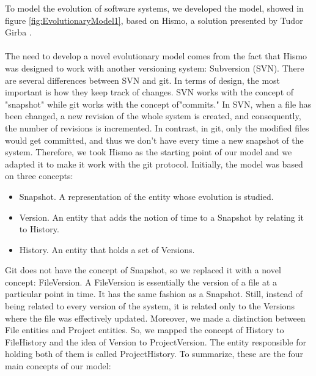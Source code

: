 To model the evolution of software systems, we developed the model, 
showed in figure \ref{fig:EvolutionaryModel1}, based on Hismo, a solution presented by Tudor Girba \cite{Girba2005}.\\
\\
The need to develop a novel evolutionary model comes from the fact that Hismo was designed to work with another versioning system: Subversion (SVN). 
There are several differences between SVN and git. In terms of design, the most important is how they keep track of changes. 
SVN works with the concept of "snapshot" while git works with the concept of"commits." 
In SVN, when a file has been changed, a new revision of the whole system is created, and consequently, the number of revisions is incremented. 
In contrast, in git, only the modified files would get committed, and thus we don't have every time a new snapshot of the system. 
Therefore, we took Hismo as the starting point of our model and we adapted it to make it work with the git protocol. 
Initially, the model was based on three concepts:
\begin{itemize}
    \item Snapshot. A representation of the entity whose evolution is studied.
    \item Version. An entity that adds the notion of time to a Snapshot by relating it to History. 
    \item History. An entity that holds a set of Versions.
\end{itemize}
\bigbreak
Git does not have the concept of Snapshot, so we replaced it with a novel concept: FileVersion. 
A FileVersion is essentially the version of a file at a particular point in time. 
It has the same fashion as a Snapshot. Still, instead of being related to every version of the system, it is related only to the Versions where the file was effectively updated.
Moreover, we made a distinction between File entities and Project entities. So, we mapped the concept of History to FileHistory and the idea of Version to ProjectVersion. 
The entity responsible for holding both of them is called ProjectHistory. 
To summarize, these are the four main concepts of our model: 
